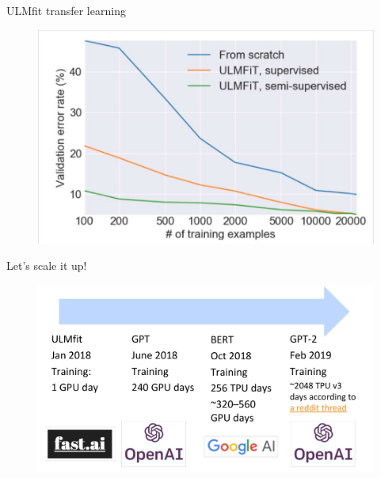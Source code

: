 \documentclass[handout]{beamer}
\begin{document}
\begin{frame}{ULMfit transfer learning}

\begin{figure}[h]
        	\includegraphics[scale = 0.3]{pics/ulmfit4.png}
        \end{figure}  


\end{frame}


\begin{frame}{Let’s scale it up!}


     \begin{figure}[h]
        	\includegraphics[scale = 0.28]{pics/llmscale.png}
        \end{figure}  


\end{frame}
\end{document}
